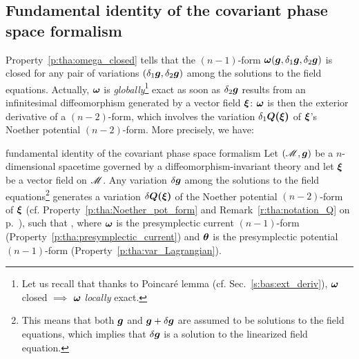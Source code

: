 \subsection{Fundamental identity of the covariant phase space formalism}

Property~\ref{p:tha:omega_closed} tells that the $(n-1)$-form
$\bm{\omega}(\bm{g},\delta_1\bm{g},\delta_2\bm{g})$ is closed for any pair
of variations $(\delta_1\bm{g},\delta_2\bm{g})$ among the solutions to the field equations.
Actually, $\bm{\omega}$ is
\emph{globally}\footnote{Let us recall that thanks to Poincaré lemma (cf. Sec.~\ref{s:bas:ext_deriv}),
$\bm{\omega}$ closed $\implies$ $\bm{\omega}$ \emph{locally} exact.} exact as soon as
$\delta_2\bm{g}$ results from an infinitesimal diffeomorphism
generated by a vector field $\bm{\xi}$:  $\bm{\omega}$ is then the exterior derivative
of a $(n-2)$-form, which involves the variation $\delta_1 \bm{Q}\textbf{(}\bm{\xi}\textbf{)}$
of $\bm{\xi}$'s Noether potential $(n-2)$-form. More precisely, we have:

\begin{tprop}{fundamental identity of the covariant phase space formalism}{}
Let $(\mathscr{M},\bm{g})$ be a $n$-dimensional spacetime governed by a
diffeomorphism-invariant theory and let $\bm{\xi}$ be a vector field on $\mathscr{M}$.
Any variation $\delta\bm{g}$ among the solutions to the field equations\footnote{This means
that both $\bm{g}$ and $\bm{g}+\delta\bm{g}$ are assumed to be
solutions to the field equations, which
implies that $\delta\bm{g}$ is a solution to the linearized field equation.}
generates a variation $\delta\bm{Q}\textbf{(}\bm{\xi}\textbf{)}$ of the
Noether potential $(n-2)$-form of $\bm{\xi}$ (cf. Property~\ref{p:tha:Noether_pot_form}
and Remark~\ref{r:tha:notation_Q} on p.~\pageref{r:tha:notation_Q}),
such that
\be \label{e:tha:fund_identity}
    ,
\ee
where $\bm{\omega}$ is the presymplectic current $(n-1)$-form (Property~\ref{p:tha:presymplectic_current}) and $\bm{\theta}$ is
the presymplectic potential $(n-1)$-form (Property~\ref{p:tha:var_Lagrangian}).
\end{tprop}

